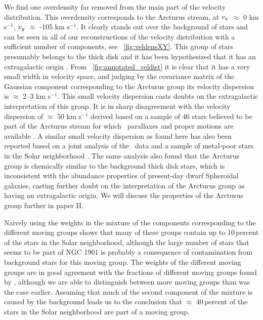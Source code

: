 We find one overdensity far removed from the main part of the velocity
distribution. This overdensity corresponds to the Arcturus stream, at
$v_x$ $\approx$ 0 km s$^{-1}$, $v_y$ $\approx$ -105 km s$^{-1}$. It
clearly stands out over the background of stars and can be seen in all
of our reconstructions of the velocity distribution with a sufficient
number of components, see \figurename~\ref{fig:veldensXY}. This group
of stars presumably belongs to the thick disk and it has been
hypothesized that it has an extragalactic origin
\citep{2004ApJ...601L..43N}. From
\figurename~\ref{fig:annotated_veldist} it is clear that it has a very
small width in velocity space, and judging by the covariance matrix of
the Gaussian component corresponding to the Arcturus group its
velocity dispersion is $\approx$ 2--3 km s$^{-1}$. This small velocity
dispersion casts doubts on the extragalactic interpretation of this
group. It is in sharp disagreement with the velocity dispersion of
$\approx$ 50 km s$^{-1}$ derived based on a sample of 46 stars
believed to be part of the Arcturus stream for which \Hipparcos\
parallaxes and proper motions are available
\citep{2004ApJ...601L..43N}. A similar small velocity dispersion as
found here has also been reported based on a joint analysis of the
\gcsabb\ data and a sample of metal-poor stars in the Solar
neighborhood \citep{2009IAUS..254..139W,2006A&A...445..939S}. The same
analysis also found that the Arcturus group is chemically similar to
the background thick disk stars, which is inconsistent with the
abundance properties of present-day dwarf Spheroidal galaxies, casting
further doubt on the interpretation of the Arcturus group as having an
extragalactic origin. We will discuss the properties of the Arcturus
group further in paper II.

Naively using the weights in the mixture of the components
corresponding to the different moving groups shows that many of these
groups contain up to 10\,percent of the stars in the Solar
neighborhood, although the large number of stars that seems to be part
of NGC 1901 is probably a consequence of contamination from background
stars for this moving group. The weights of the different moving
groups are in good agreement with the fractions of different moving
groups found by \citet{2005A&A...430..165F}, although we are able to
distinguish between more moving groups than was the case
earlier. Assuming that much of the second component of the mixture is
caused by the background leads us to the conclusion that $\approx$
40\,percent of the stars in the Solar neighborhood are part of a
moving group.




